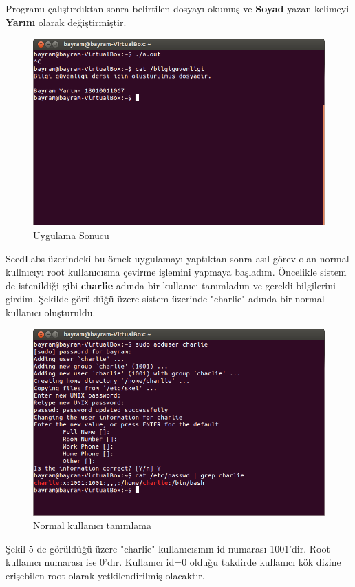 \documentclass[conference, 12pt, a4paper]{IEEEtran}
\begin{document}
\begin{sloppypar}
    Programı çalıştırdıktan sonra belirtilen dosyayı okumuş ve \textbf{Soyad} yazan kelimeyi \textbf{Yarım} olarak değiştirmiştir.
    \begin{figure}[htbp]
        \centering
        \includegraphics[scale=0.28]{process-out.png}
        \caption{Uygulama Sonucu}
    \end{figure}

    SeedLabs üzerindeki bu örnek uygulamayı yaptıktan sonra asıl görev olan normal kullnıcıyı root kullanıcısına çevirme işlemini yapmaya başladım. Öncelikle sistem de istenildiği gibi \textbf{charlie} adında bir kullanıcı tanımladım ve gerekli bilgilerini girdim. Şekilde görüldüğü üzere sistem üzerinde "charlie" adında bir normal kullanıcı oluşturuldu.

    \begin{figure}[htbp]
        \centering
        \includegraphics[scale=0.28]{add-user-charlie.png}
        \caption{Normal kullanıcı tanımlama}
    \end{figure}
    Şekil-5 de görüldüğü üzere "charlie" kullanıcısının id numarası 1001'dir. Root kullanıcı numarası ise 0'dır. Kullanıcı id=0 olduğu takdirde kullanıcı kök dizine erişebilen root olarak yetkilendirilmiş olacaktır.


\end{sloppypar}
\end{document}
